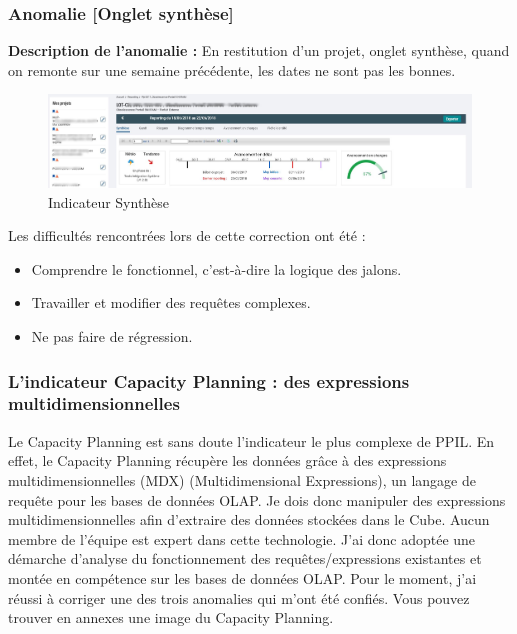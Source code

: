 \subsubsection{Anomalie [Onglet synthèse]}

\textbf{Description de l'anomalie :} En restitution d'un projet, onglet synthèse, quand on remonte sur une semaine précédente, les dates ne sont pas les bonnes. 

\begin{figure}[!h]
\centering
\includegraphics[width=1\textwidth]{images/ppil-indicateur-synthese-censored.png}
\caption{Indicateur Synthèse}
\end{figure}

Les difficultés rencontrées lors de cette correction ont été :
\begin{itemize}
    \item Comprendre le fonctionnel, c'est-à-dire la logique des jalons.
    \item Travailler et modifier des requêtes complexes.
    \item Ne pas faire de régression.
\end{itemize}


\subsubsection{L'indicateur Capacity Planning : des expressions multidimensionnelles}

Le Capacity Planning est sans doute l'indicateur le plus complexe de PPIL. En effet, le Capacity Planning récupère les données grâce à des expressions multidimensionnelles (MDX) (Multidimensional Expressions), un langage de requête pour les bases de données OLAP. Je dois donc manipuler des expressions multidimensionnelles afin d'extraire des données stockées dans le Cube. Aucun membre de l'équipe est expert dans cette technologie. J'ai donc adoptée une démarche d'analyse du fonctionnement des requêtes/expressions existantes et montée en compétence sur les bases de données OLAP. Pour le moment, j'ai réussi à corriger une des trois anomalies qui m'ont été confiés. Vous pouvez trouver en annexes une image du Capacity Planning.

